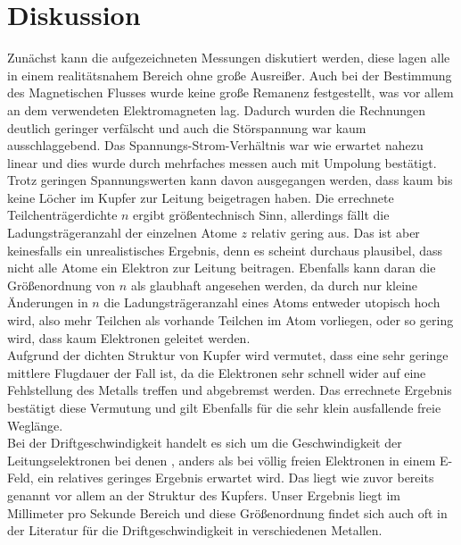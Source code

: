 \section{Diskussion}

Zunächst kann die aufgezeichneten Messungen diskutiert werden, diese lagen alle in einem realitätsnahem Bereich ohne große Ausreißer.
Auch bei der Bestimmung des Magnetischen Flusses wurde keine große Remanenz festgestellt, was vor allem an dem verwendeten Elektromagneten lag.
Dadurch wurden die Rechnungen deutlich geringer verfälscht und auch die Störspannung war kaum ausschlaggebend.
Das Spannungs-Strom-Verhältnis war wie erwartet nahezu linear und dies wurde durch mehrfaches messen auch mit Umpolung bestätigt.
\\
Trotz geringen Spannungswerten kann davon ausgegangen werden, dass kaum bis keine Löcher im Kupfer zur Leitung beigetragen haben. 
Die errechnete Teilchenträgerdichte $n$ ergibt größentechnisch Sinn, allerdings fällt die Ladungsträgeranzahl der einzelnen Atome $z$
relativ gering aus. Das ist aber keinesfalls ein unrealistisches Ergebnis, denn es scheint durchaus plausibel, dass nicht alle Atome ein Elektron zur Leitung
beitragen. Ebenfalls kann daran die Größenordnung von $n$ als glaubhaft angesehen werden, da durch nur kleine Änderungen in $n$ die Ladungsträgeranzahl eines Atoms entweder utopisch hoch wird, 
also mehr Teilchen als vorhande Teilchen im Atom vorliegen, oder so gering wird, dass kaum Elektronen geleitet werden.
\\
Aufgrund der dichten Struktur von Kupfer wird vermutet, dass eine sehr geringe mittlere Flugdauer der Fall ist, da die Elektronen sehr schnell wider auf eine Fehlstellung des
Metalls treffen und abgebremst werden. Das errechnete Ergebnis bestätigt diese Vermutung und gilt Ebenfalls für die sehr klein ausfallende freie Weglänge.
\\
Bei der Driftgeschwindigkeit handelt es sich um die Geschwindigkeit der Leitungselektronen bei denen , anders als bei völlig freien Elektronen in einem E-Feld, ein relatives geringes
Ergebnis erwartet wird. Das liegt wie zuvor bereits genannt vor allem an der Struktur des Kupfers. 
Unser Ergebnis liegt im Millimeter pro Sekunde Bereich und diese Größenordnung findet sich auch oft in der Literatur für die Driftgeschwindigkeit in verschiedenen Metallen.
